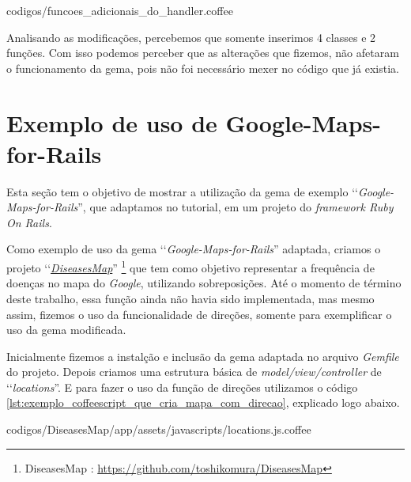 
{codigos/funcoes_adicionais_do_handler.coffee}

Analisando as modificações, percebemos que somente inserimos 4 classes e 2 funções. Com isso podemos
perceber que as alterações que fizemos, não afetaram o funcionamento da gema, pois não foi
necessário mexer no código que já existia.

\section{Exemplo de uso de Google-Maps-for-Rails}
\label{section:exemplo_de_uso_de_google-maps-for-rails}

Esta seção tem o objetivo de mostrar a utilização da gema de exemplo ‘‘\emph{Google-Maps-for-Rails}'',
que adaptamos no tutorial, em um projeto do \emph{framework Ruby On Rails}.

Como exemplo de uso da gema ‘‘\emph{Google-Maps-for-Rails}'' adaptada, criamos o projeto 
‘‘\emph{\href{https://github.com/toshikomura/DiseasesMap}{DiseasesMap}}'' 
\footnote{DiseasesMap : \url{https://github.com/toshikomura/DiseasesMap}} que tem como objetivo representar 
a frequência de doenças no mapa do \emph{Google}, utilizando sobreposições. Até o momento de término deste
trabalho, essa função ainda não havia sido implementada, mas mesmo assim, fizemos o uso da
funcionalidade de direções, somente para exemplificar o uso da gema modificada.

Inicialmente fizemos a instalção e inclusão da gema adaptada no arquivo \emph{Gemfile} do projeto. Depois 
criamos uma estrutura básica de \emph{model/view/controller} de ‘‘\emph{locations}''. E para fazer o uso
da função de direções utilizamos o código \ref{lst:exemplo_coffeescript_que_cria_mapa_com_direcao},
explicado logo abaixo.


{codigos/DiseasesMap/app/assets/javascripts/locations.js.coffee}

